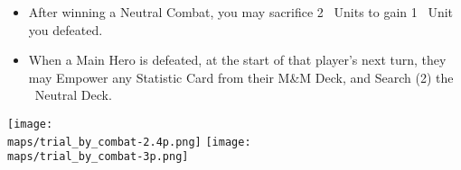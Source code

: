 \begin{multicols*}{2}
\begin{itemize}
  \item After winning a Neutral Combat, you may sacrifice 2 \bronze\ Units to gain 1 \silver\ Unit you defeated.
  \item When a Main Hero is defeated, at the start of that player's next turn, they may Empower any Statistic Card from their M\&M Deck, and Search (2) the \silver\ Neutral Deck.
\end{itemize}

\begin{center}
  \vfill
  \texttt{[image: \\maps/trial\_by\_combat-2.4p.png]}
  \vfill
  \texttt{[image: \\maps/trial\_by\_combat-3p.png]}
\end{center}

\end{multicols*}
